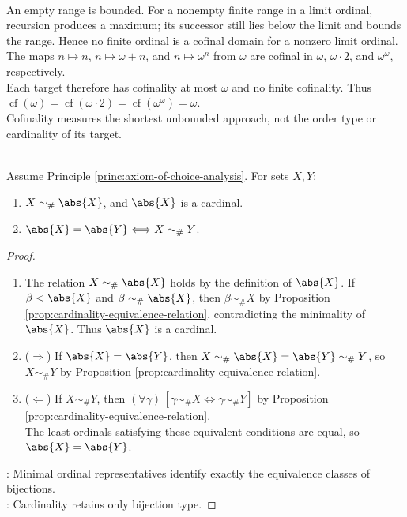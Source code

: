 \begin{example} \label{ex:basic-ordinal-cofinalities} \\
An empty range is bounded. For a nonempty finite range in a limit ordinal, recursion produces a maximum; its successor still lies below the limit and bounds the range. Hence no finite ordinal is a cofinal domain for a nonzero limit ordinal.\\
The maps $n\mapsto n$, $n\mapsto\omega+n$, and $n\mapsto\omega^n$ from $\omega$ are cofinal in $\omega$, $\omega\cdot2$, and $\omega^\omega$, respectively.\\
Each target therefore has cofinality at most $\omega$ and no finite cofinality. Thus $\operatorname{cf}(\omega)=\operatorname{cf}(\omega\cdot2)=\operatorname{cf}(\omega^\omega)=\omega$.\\
Cofinality measures the shortest unbounded approach, not the order type or cardinality of its target.
\end{example}

\begin{proposition} \label{prop:cardinality-canonical-and-bijection-invariant} \\
Assume Principle \ref{princ:axiom-of-choice-analysis}. For sets $X,Y$:
\begin{enumerate}[label=(\roman*)]
\setlength{\itemsep}{0pt}
\item $X\sim_{\#}\abs{X}$, and $\abs{X}$ is a cardinal.
\item $\abs{X}=\abs{Y}\Longleftrightarrow X\sim_{\#}Y$.
\end{enumerate}
\begin{proof}
\begin{enumerate}[label=(\roman*)]
\setlength{\itemsep}{0pt}
\item[$(i)$] The relation $X\sim_{\#}\abs{X}$ holds by the definition of $\abs{X}$. If $\beta<\abs{X}$ and $\beta\sim_{\#}\abs{X}$, then $\beta\sim_{\#}X$ by Proposition \ref{prop:cardinality-equivalence-relation}, contradicting the minimality of $\abs{X}$. Thus $\abs{X}$ is a cardinal.
\item[$(ii)$] ($\Rightarrow$) If $\abs{X}=\abs{Y}$, then $X\sim_{\#}\abs{X}=\abs{Y}\sim_{\#}Y$, so $X\sim_{\#}Y$ by Proposition \ref{prop:cardinality-equivalence-relation}.
\item[$(ii)$] ($\Leftarrow$) If $X\sim_{\#}Y$, then $(\forall\gamma)\,[\gamma\sim_{\#}X\Longleftrightarrow\gamma\sim_{\#}Y]$ by Proposition \ref{prop:cardinality-equivalence-relation}.\\
The least ordinals satisfying these equivalent conditions are equal, so $\abs{X}=\abs{Y}$.
\end{enumerate}
: Minimal ordinal representatives identify exactly the equivalence classes of bijections.\\
: Cardinality retains only bijection type.
\end{proof}
\end{proposition}

